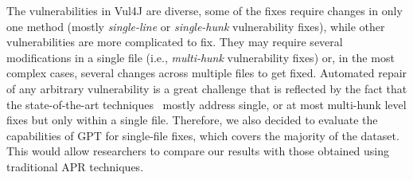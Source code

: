 The vulnerabilities in Vul4J are diverse, some of the fixes require changes in only one method (mostly \textit{single-line} or \textit{single-hunk} vulnerability fixes), while other vulnerabilities are more complicated to fix.
They may require several modifications in a single file (i.e., \textit{multi-hunk} vulnerability fixes) or, in the most complex cases, several changes across multiple files to get fixed.
Automated repair of any arbitrary vulnerability is a great challenge that is reflected by the fact that the state-of-the-art techniques~\cite{fix_llm_with_tests, saha2019harnessing} mostly address single, or at most multi-hunk level fixes but only within a single file.
Therefore, we also decided to evaluate the capabilities of GPT for single-file fixes, which covers the majority of the dataset.
%
This would allow researchers to compare our results with those obtained using traditional APR techniques.

